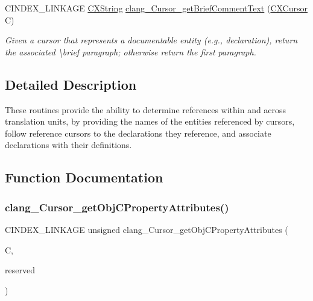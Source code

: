 \begin{DoxyCompactItemize}
\mbox{\label{group__CINDEX__CURSOR__XREF_ga6b5282b915d457d728434c0651ea0b8b}} 
C\+I\+N\+D\+E\+X\+\_\+\+L\+I\+N\+K\+A\+GE \hyperlink{structCXString}{C\+X\+String} \hyperlink{group__CINDEX__CURSOR__XREF_ga6b5282b915d457d728434c0651ea0b8b}{clang\+\_\+\+Cursor\+\_\+get\+Brief\+Comment\+Text} (\hyperlink{structCXCursor}{C\+X\+Cursor} C)
\begin{DoxyCompactList}\small\item\em Given a cursor that represents a documentable entity (e.\+g., declaration), return the associated \textbackslash{}brief paragraph; otherwise return the first paragraph. \end{DoxyCompactList}\end{DoxyCompactItemize}


\subsection{Detailed Description}
These routines provide the ability to determine references within and across translation units, by providing the names of the entities referenced by cursors, follow reference cursors to the declarations they reference, and associate declarations with their definitions. 

\subsection{Function Documentation}
\mbox{\label{group__CINDEX__CURSOR__XREF_ga3a964b4c56f8bfb8229a9a08114e2567}} 
\subsubsection{\texorpdfstring{clang\+\_\+\+Cursor\+\_\+get\+Obj\+C\+Property\+Attributes()}{clang\_Cursor\_getObjCPropertyAttributes()}}
{\footnotesize\ttfamily C\+I\+N\+D\+E\+X\+\_\+\+L\+I\+N\+K\+A\+GE unsigned clang\+\_\+\+Cursor\+\_\+get\+Obj\+C\+Property\+Attributes (\begin{DoxyParamCaption}\item[{\hyperlink{structCXCursor}{C\+X\+Cursor}}]{C,  }\item[{unsigned}]{reserved }\end{DoxyParamCaption})}



